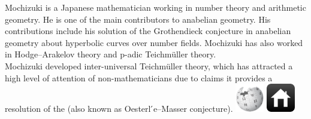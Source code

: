 \documentclass[9pt]{beamer}
\begin{document}
\begin{frame}
            \begin{columns}\label{mochizuki}
                    \justify
                    Mochizuki is a Japanese mathematician working in number theory and arithmetic geometry. He is one of the main contributors to anabelian geometry. His contributions include his solution of the Grothendieck conjecture in anabelian geometry about hyperbolic curves over number fields. Mochizuki has also worked in Hodge–Arakelov theory and p-adic Teichmüller theory. \\\vspace{0.50cm}
                    Mochizuki developed inter-universal Teichmüller theory, which has attracted a high level of attention of non-mathematicians due to claims it provides a resolution of the \hyperlink{abc}{} (also known as Oesterl ́e–Masser conjecture).
                \pause
                    \href{https://en.wikipedia.org/wiki/Shinichi_Mochizuki}{
                        \includegraphics[width=1.25cm, height=1.25cm]{images/wiki.png}}
                    \vspace{0.8cm}
                    \href{https://www.kurims.kyoto-u.ac.jp/~motizuki/top-english.html}{
                        \includegraphics[width=1.25cm, height=1.25cm]{images/home.png}}
            \end{columns}
        
        \end{frame}

\end{document}
